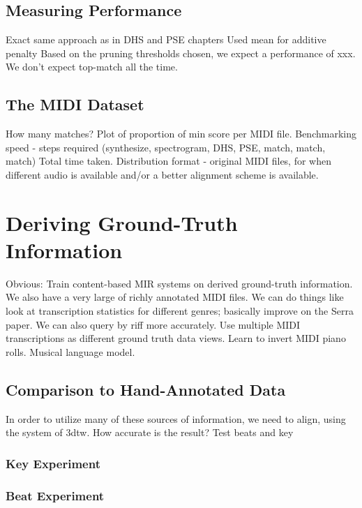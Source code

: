 \subsection{Measuring Performance}

Exact same approach as in DHS and PSE chapters
Used mean for additive penalty
Based on the pruning thresholds chosen, we expect a performance of xxx.
We don't expect top-match all the time.

\subsection{The MIDI Dataset}

How many matches?  Plot of proportion of min score per MIDI file.
Benchmarking speed - steps required (synthesize, spectrogram, DHS, PSE, match, match, match)  Total time taken.
Distribution format - original MIDI files, for when different audio is available and/or a better alignment scheme is available.

\section{Deriving Ground-Truth Information}
\label{sec:deriving}

Obvious: Train content-based MIR systems on derived ground-truth information.
We also have a very large of richly annotated MIDI files.
We can do things like look at transcription statistics for different genres; basically improve on the Serra paper.
We can also query by riff more accurately.
Use multiple MIDI transcriptions as different ground truth data views.
Learn to invert MIDI piano rolls.
Musical language model.

\subsection{Comparison to Hand-Annotated Data}
\label{sec:reliability}

In order to utilize many of these sources of information, we need to align, using the system of 3dtw.
How accurate is the result?
Test beats and key

\subsubsection{Key Experiment}

\subsubsection{Beat Experiment}

